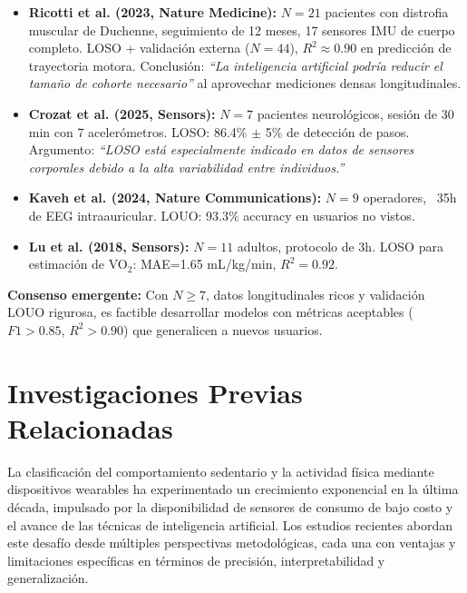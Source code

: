 \begin{itemize}
    \item \textbf{Ricotti et al. (2023, Nature Medicine):} $N=21$ pacientes con distrofia muscular de Duchenne, seguimiento de 12 meses, 17 sensores IMU de cuerpo completo. LOSO + validación externa ($N=44$), $R^2 \approx 0.90$ en predicción de trayectoria motora. Conclusión: \textit{``La inteligencia artificial podría reducir el tamaño de cohorte necesario''} al aprovechar mediciones densas longitudinales.
    
    \item \textbf{Crozat et al. (2025, Sensors):} $N=7$ pacientes neurológicos, sesión de 30 min con 7 acelerómetros. LOSO: 86.4\% $\pm$ 5\% de detección de pasos. Argumento: \textit{``LOSO está especialmente indicado en datos de sensores corporales debido a la alta variabilidad entre individuos.''}
    
    \item \textbf{Kaveh et al. (2024, Nature Communications):} $N=9$ operadores, ~35h de EEG intraauricular. LOUO: 93.3\% accuracy en usuarios no vistos.
    
    \item \textbf{Lu et al. (2018, Sensors):} $N=11$ adultos, protocolo de 3h. LOSO para estimación de VO$_2$: MAE=1.65 mL/kg/min, $R^2=0.92$.
\end{itemize}

\textbf{Consenso emergente:} Con $N \geq 7$, datos longitudinales ricos y validación LOUO rigurosa, es factible desarrollar modelos con métricas aceptables ($F1 > 0.85$, $R^2 > 0.90$) que generalicen a nuevos usuarios.

\section{Investigaciones Previas Relacionadas}
\label{sec:investigaciones_previas}


La clasificación del comportamiento sedentario y la actividad física mediante dispositivos wearables ha experimentado un crecimiento exponencial en la última década, impulsado por la disponibilidad de sensores de consumo de bajo costo y el avance de las técnicas de inteligencia artificial. Los estudios recientes abordan este desafío desde múltiples perspectivas metodológicas, cada una con ventajas y limitaciones específicas en términos de precisión, interpretabilidad y generalización.

